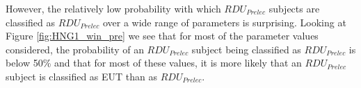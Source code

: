 \documentclass[../main.tex]{subfiles}
\begin{document}
However, the relatively low probability with which $\mathit{RDU_{Prelec}}$ subjects are classified as $\mathit{RDU_{Prelec}}$ over a wide range of parameters is surprising.
Looking at Figure \ref{fig:HNG1_win_pre} we see that for most of the parameter values considered, the probability of an $\mathit{RDU_{Prelec}}$ subject being classified as $\mathit{RDU_{Prelec}}$ is below 50\% and that for most of these values, it is more likely that an $\mathit{RDU_{Prelec}}$ subject is classified as EUT than as $\mathit{RDU_{Prelec}}$.


\end{document}
